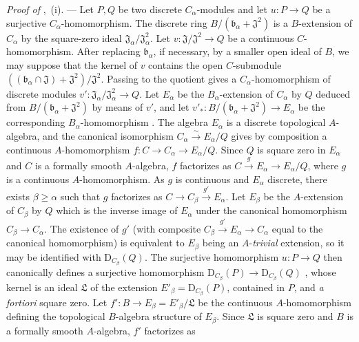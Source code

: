 \begin{env}[19.5.6.1]
\label{0.19.5.6.1}
\emph{Proof of} ,~(i). ---
Let $P,Q$ be two discrete $C_\alpha$-modules and let
$u:P\to Q$ be a surjective $C_\alpha$-homomorphism.
The discrete ring $B/(\mathfrak{b}_\alpha+\mathfrak{J}^2)$ is a $B$-extension of $C_\alpha$ by the square-zero ideal
$\mathfrak{J}_\alpha/\mathfrak{J}_\alpha^2$.
Let $v:\mathfrak{J}/\mathfrak{J}^2\to Q$ be a continuous $C$-homomorphism.
After replacing $\mathfrak{b}_\alpha$, if necessary, by a smaller open ideal of $B$, we may suppose that the kernel of $v$ contains the open $C$-submodule
$((\mathfrak{b}_\alpha\cap\mathfrak{J})+\mathfrak{J}^2)/\mathfrak{J}^2$.
Passing to the quotient gives a $C_\alpha$-homomorphism of discrete modules
$v':\mathfrak{J}_\alpha/\mathfrak{J}_\alpha^2\to Q$.
Let $E_\alpha$ be the $B_\alpha$-extension of $C_\alpha$ by $Q$ deduced from
$B/(\mathfrak{b}_\alpha+\mathfrak{J}^2)$ by means of $v'$, and let
$v'_*:B/(\mathfrak{b}_\alpha+\mathfrak{J}^2)\to E_\alpha$
be the corresponding $B_\alpha$-homomorphism .
The algebra $E_\alpha$ is a discrete topological $A$-algebra, and the canonical isomorphism
$C_\alpha\xrightarrow{\sim}E_\alpha/Q$ gives by composition a continuous
$A$-homomorphism $f:C\to C_\alpha\to E_\alpha/Q$.
Since $Q$ is square zero in $E_\alpha$ and $C$ is a formally smooth $A$-algebra,
$f$ factorizes as
$C\xrightarrow{g}E_\alpha\to E_\alpha/Q$, where $g$ is a continuous
$A$-homomorphism.
As $g$ is continuous and $E_\alpha$ discrete, there exists $\beta\geq\alpha$
such that $g$ factorizes as
$C\to C_\beta\xrightarrow{g'}E_\alpha$.
Let $E_\beta$ be the $A$-extension of $C_\beta$ by $Q$ which is the inverse image
of $E_\alpha$ under the canonical homomorphism $C_\beta\to C_\alpha$.
The existence of $g'$ (with composite $C_\beta\xrightarrow{g'}E_\alpha\to C_\alpha$ equal
to the canonical homomorphism) is equivalent to $E_\beta$ being an
$A$-\emph{trivial} extension, so it may be identified with
$\mathrm{D}_{C_\beta}(Q)$.
The surjective homomorphism $u:P\to Q$ then canonically defines a
surjective homomorphism
$\mathrm{D}_{C_\beta}(P)\to\mathrm{D}_{C_\beta}(Q)$ , whose
kernel is an ideal $\mathfrak{L}$ of the extension
$E'_\beta=\mathrm{D}_{C_\beta}(P)$, contained in $P$, and \emph{a fortiori}
square zero.
Let $f':B\to E_\beta=E'_\beta/\mathfrak{L}$ be the continuous $A$-homomorphism
defining the topological $B$-algebra structure of $E_\beta$.
Since $\mathfrak{L}$ is square zero and $B$ is a formally smooth $A$-algebra,
$f'$ factorizes as

\end{env}
